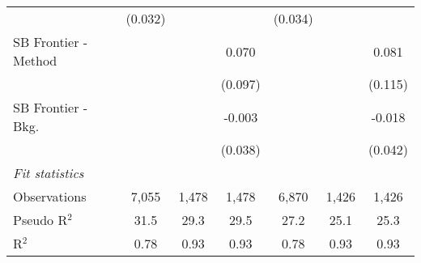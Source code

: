 \begin{tabular}{lcccccc}
                                & (0.032)        &                &                & (0.034)        &                &   \\   
   SB Frontier - Method         &                &                & 0.070          &                &                & 0.081\\   
                                &                &                & (0.097)        &                &                & (0.115)\\   
   SB Frontier - Bkg.           &                &                & -0.003         &                &                & -0.018\\   
                                &                &                & (0.038)        &                &                & (0.042)\\   
   \midrule
   \emph{Fit statistics}\\
   Observations                 & 7,055          & 1,478          & 1,478          & 6,870          & 1,426          & 1,426\\  
   Pseudo R$^2$                 & 31.5           & 29.3           & 29.5           & 27.2           & 25.1           & 25.3\\  
   R$^2$                        & 0.78           & 0.93           & 0.93           & 0.78           & 0.93           & 0.93\\  
   

\end{tabular}
